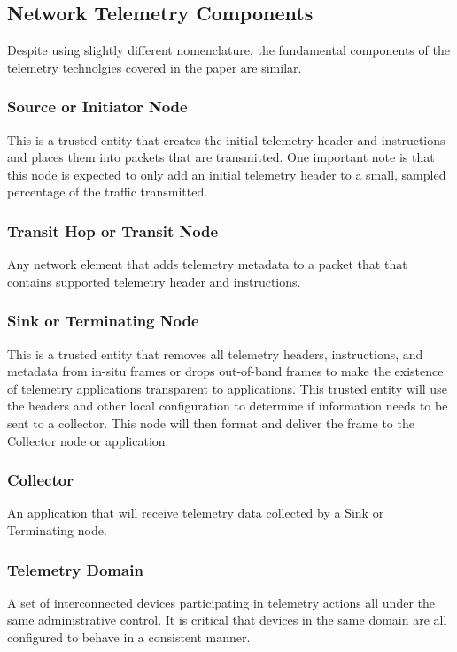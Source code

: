 \documentclass[letterpaper,twocolumn,10pt]{article}
\begin{document}
\subsection{Network Telemetry Components}

Despite using slightly different nomenclature, the fundamental
components of the telemetry technolgies covered in the paper
are similar.

\subsubsection{Source or Initiator Node}
This is a trusted entity that creates the initial telemetry header and
instructions and places them into packets that are transmitted.  One
important note is that this node is expected to only add an initial
telemetry header to a small, sampled percentage of the traffic
transmitted.

\subsubsection{Transit Hop or Transit Node}
Any network element that adds telemetry metadata to a packet that
that contains supported telemetry header and instructions.

\subsubsection{Sink or Terminating Node}
This is a trusted entity that removes all telemetry headers,
instructions, and metadata from in-situ frames or drops out-of-band
frames to make the existence of telemetry applications transparent to
applications.  This trusted entity will use the headers and other local
configuration to determine if information needs to be sent to a
collector.  This node will then format and deliver the frame to the
Collector node or application.

\subsubsection{Collector}
An application that will receive telemetry data collected by a Sink or
Terminating node.

\subsubsection{Telemetry Domain}
A set of interconnected devices participating in telemetry actions all
under the same administrative control.  It is critical that devices in
the same domain are all configured to behave in a consistent manner.
\end{document}
